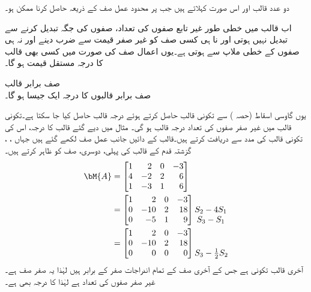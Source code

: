 دو عدد قالب  اور   اس صورت  کہلاتے ہیں جب  پر محدود عمل صف کے ذریعہ  حاصل کرنا ممکن ہو۔

اب قالب میں خطی طور غیر تابع صفوں کی تعداد، صفوں کی جگہ تبدیل کرنے سے  تبدیل نہیں ہوتی اور نا ہی کسی صف کو غیر صفر قیمت  سے ضرب دینے اور نہ ہی صفوں کے خطی ملاپ سے  ہوتی ہے۔یوں اعمال صف کی صورت میں کسی بھی قالب کا درجہ مستقل قیمت ہو گا۔

\quad صف برابر قالب\\
صف برابر قالبوں کا درجہ ایک جیسا ہو گا۔

یوں گاوسی اسقاط (حصہ ) سے  تکونی قالب حاصل کرتے ہوئے درجہ قالب حاصل کیا جا سکتا ہے۔تکونی قالب میں غیر صفر صفوں کی تعداد درجہ قالب ہو گی۔  
مثال  میں دیے گئے قالب کا درجہ، اس کی تکونی قالب کی مدد سے دریافت کرتے ہیں۔قالب کے دائیں جانب عمل صف لکھے گئے ہیں جہاں ، ،   گزشتہ قدم کے قالب کی پہلی، دوسری،   صف کو ظاہر کرتے ہیں۔
\begin{align*}
\bM{A}&=\begin{bmatrix*}[r] 1&2&0&-3\\4&-2&2&6\\1&-3&1&6 \end{bmatrix*}\\
&=\begin{bmatrix*}[r] 1&2&0&-3\\0&-10&2&18\\0&-5&1&9 \end{bmatrix*}\begin{matrix}\\ S_2-4S_1\\
S_3-S_1 \end{matrix}\\
&=\begin{bmatrix*}[r] 1&2&0&-3\\0&-10&2&18\\0&0&0&0 \end{bmatrix*}\begin{matrix}\\   \\
S_3-\frac{1}{2}S_2 \end{matrix}
\end{align*}
آخری قالب تکونی ہے جس کے آخری صف کے تمام اندراجات صفر کے برابر ہیں لہٰذا یہ صفر صف ہے۔غیر صفر صفوں کی تعداد  ہے لہٰذا  کا درجہ بھی  ہے۔

